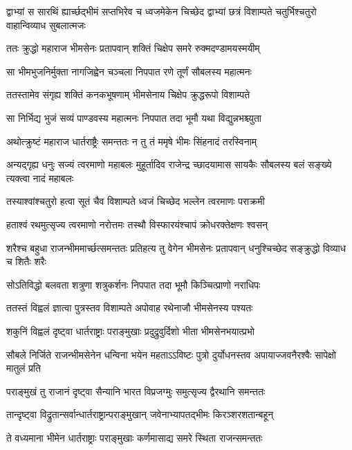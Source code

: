 \threelineshloka
{द्वाभ्यां स सारथिं ह्यार्च्छद्भीमं सप्तभिरेव च}
{ध्वजमेकेन चिच्छेद द्वाभ्यां छत्रं विशाम्पते}
{चतुर्भिश्चतुरो वाहान्विव्याध सुबलात्मजः}


\twolineshloka
{ततः क्रुद्धो महाराज भीमसेनः प्रतापवान्}
{शक्तिं चिक्षेप समरे रुक्मदण्डामयस्मयीम्}


\twolineshloka
{सा भीमभुजनिर्मुक्ता नागजिह्वेन चञ्चला}
{निपपात रणे तूर्णं सौबलस्य महात्मनः}


\twolineshloka
{ततस्तामेव संगृह्य शक्तिं कनकभूषणाम्}
{भीमसेनाय चिक्षेप क्रुद्धरूपो विशाम्पते}


\twolineshloka
{सा निर्भिद्य भुजं सव्यं पाण्डवस्य महात्मनः}
{निपपात तदा भूमौ यथा विद्युन्नभश्च्युता}


\twolineshloka
{अथोत्क्रुष्टं महाराज धार्तराष्ट्रैः समन्ततः}
{न तु तं ममृषे भीमः सिंहनादं तरस्विनाम्}


\threelineshloka
{अन्यद्गृह्य धनुः सज्यं त्वरमाणो महाबलः}
{मुहूर्तादिव राजेन्द्र च्छादयामास सायकैः}
{सौबलस्य बलं सङ्ख्ये त्यक्त्वा नादं महाबलः}


\twolineshloka
{तस्याश्वांश्चतुरो हत्वा सूतं चैव विशाम्पते}
{ध्वजं चिच्छेद भल्लेन त्वरमाणः पराक्रमी}


\twolineshloka
{हताश्वं रथमुत्सृज्य त्वरमाणो नरोत्तमः}
{तस्थौ विस्फारयंश्चापं क्रोधरक्तेक्षणः श्वसन्}


शरैश्च बहुधा राजन्भीममार्च्छत्समन्ततः
\twolineshloka
{प्रतिहत्य तु वेगेन भीमसेनः प्रतापवान्}
{धनुश्चिच्छेद सङ्क्रुद्धो विव्याध च शितैः शरैः}


\twolineshloka
{सोऽतिविद्धो बलवता शत्रुणा शत्रुकर्शनः}
{निपपात तदा भूमौ किञ्चित्प्राणो नराधिपः}


\twolineshloka
{ततस्तं विह्वलं ज्ञात्वा पुत्रस्तव विशाम्पते}
{अपोवाह रथेनाजौ भीमसेनस्य पश्यतः}


\twolineshloka
{शकुनिं विह्वलं दृष्ट्वा धार्तराष्ट्राः पराङ्मुखाः}
{प्रदुद्रुवुर्दिशो भीता भीमसेनभयात्प्रभो}


\threelineshloka
{सौबले निर्जिते राजन्भीमसेनेन धन्विना}
{भयेन महताऽऽविष्टः पुत्रो दुर्योधनस्तव}
{अपायाज्जवनैरश्वैः सापेक्षो मातुलं प्रति}


\twolineshloka
{पराङ्मुखं तु राजानं दृष्ट्वा सैन्यानि भारत}
{विप्रजग्मुः समुत्सृज्य द्वैरथानि समन्ततः}


\twolineshloka
{तान्दृष्ट्वा विद्रुतान्सर्वान्धार्तराष्ट्रान्पराङ्मुखान्}
{जवेनाभ्यापतद्भीमः किरञ्शरशतान्बहून्}


\twolineshloka
{ते वध्यमाना भीमेन धार्तराष्ट्राः पराङ्मुखाः}
{कर्णमासाद्य समरे स्थिता राजन्समन्ततः}


